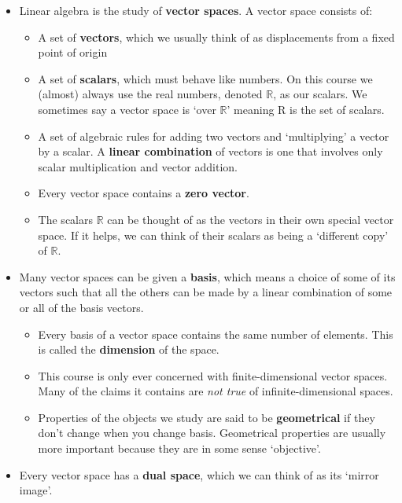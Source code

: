 \documentclass[oneside,english]{amsbook}
\numberwithin{section}{chapter}
\theoremstyle{plain}
\theoremstyle{definition}
\begin{document}
\begin{itemize}
	\item
	Linear algebra is the study of \textbf{vector spaces}. A vector space
	consists of:
	
	\begin{itemize}
		\item
		A set of \textbf{vectors}, which we usually think of as
		displacements from a fixed point of origin
		\item
		A set of \textbf{scalars}, which must behave like numbers. On this
		course we (almost) always use the real numbers, denoted $\mathbb{R}$,
		as our scalars. We sometimes say a vector space is `over
		$\mathbb{R}$' meaning R is the set of scalars.
		\item
		A set of algebraic rules for adding two vectors and `multiplying'
		a vector by a scalar. A \textbf{linear combination} of vectors is
		one that involves only scalar multiplication and vector addition.
		\item
		Every vector space contains a \textbf{zero vector}.
		\item
		The scalars $\mathbb{R}$ can be thought of as the vectors in their own
		special vector space. If it helps, we can think of their scalars as
		being a `different copy' of $\mathbb{R}$.
	\end{itemize}
	\item
	Many vector spaces can be given a \textbf{basis}, which means a choice
	of some of its vectors such that all the others can be made by a
	linear combination of some or all of the basis vectors.
	
	\begin{itemize}
		\item
		Every basis of a vector space contains the same number of elements.
		This is called the \textbf{dimension} of the space.
		\item
		This course is only ever concerned with finite-dimensional vector
		spaces. Many of the claims it contains are \emph{not true} of
		infinite-dimensional spaces.
		\item
		Properties of the objects we study are said to be
		\textbf{geometrical} if they don't change when you change basis.
		Geometrical properties are usually more important because they are
		in some sense `objective'.
	\end{itemize}
	\item
	Every vector space has a \textbf{dual space}, which we can think of as
	its `mirror image'.
	

\end{itemize}
\end{document}
